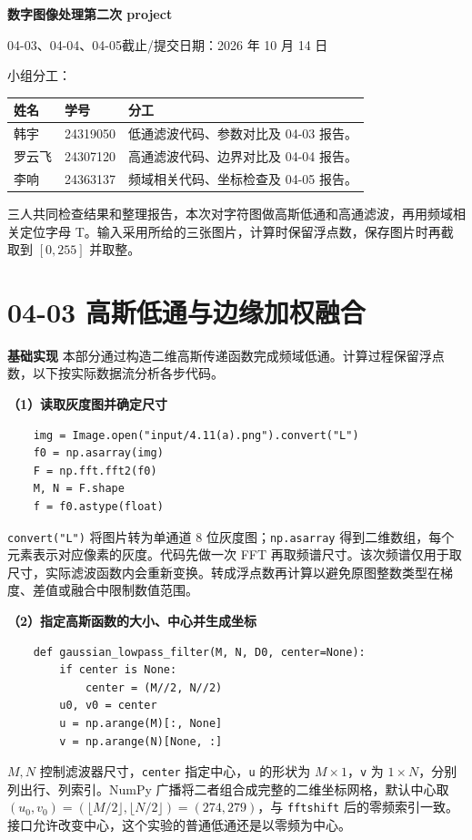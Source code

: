 \documentclass[UTF8,a4paper,zihao=5,fontset=fandol]{ctexart}
\begin{document}
\thispagestyle{plain}
\begin{center}
{\LARGE\bfseries 数字图像处理\quad 第二次 project}\par\vspace{5pt}
04-03、04-04、04-05\qquad 截止/提交日期：2026 年 10 月 14 日
\end{center}
\noindent 小组分工：
\begin{center}\small
\begin{tabularx}{\linewidth}{@{}llX@{}}\toprule
姓名 & 学号 & 分工\\\midrule
韩宇 & 24319050 & 低通滤波代码、参数对比及 04-03 报告。\\
罗云飞 & 24307120 & 高通滤波代码、边界对比及 04-04 报告。\\
李响 & 24363137 & 频域相关代码、坐标检查及 04-05 报告。\\\bottomrule
\end{tabularx}
\end{center}
三人共同检查结果和整理报告，本次对字符图做高斯低通和高通滤波，再用频域相关定位字母 T。输入采用所给的三张图片，计算时保留浮点数，保存图片时再截取到 $[0,255]$ 并取整。

\section{04-03 高斯低通与边缘加权融合}
\textbf{基础实现}  本部分通过构造二维高斯传递函数完成频域低通。计算过程保留浮点数，以下按实际数据流分析各步代码。

\textbf{（1）读取灰度图并确定尺寸}
{\small
\begin{verbatim}
    img = Image.open("input/4.11(a).png").convert("L")
    f0 = np.asarray(img)
    F = np.fft.fft2(f0)
    M, N = F.shape
    f = f0.astype(float)
\end{verbatim}
}
\texttt{convert("L")} 将图片转为单通道 8 位灰度图；\texttt{np.asarray} 得到二维数组，每个元素表示对应像素的灰度。代码先做一次 FFT 再取频谱尺寸。该次频谱仅用于取尺寸，实际滤波函数内会重新变换。转成浮点数再计算以避免原图整数类型在梯度、差值或融合中限制数值范围。

\textbf{（2）指定高斯函数的大小、中心并生成坐标}
{\small
\begin{verbatim}
    def gaussian_lowpass_filter(M, N, D0, center=None):
        if center is None:
            center = (M//2, N//2)
        u0, v0 = center
        u = np.arange(M)[:, None]
        v = np.arange(N)[None, :]
\end{verbatim}
}
$M,N$ 控制滤波器尺寸，\texttt{center} 指定中心，\texttt{u} 的形状为 $M\times1$，\texttt{v} 为 $1\times N$，分别列出行、列索引。NumPy 广播将二者组合成完整的二维坐标网格，默认中心取 $(u_0,v_0)=(\lfloor M/2\rfloor,\lfloor N/2\rfloor)=(274,279)$，与 \texttt{fftshift} 后的零频索引一致。接口允许改变中心，这个实验的普通低通还是以零频为中心。
\end{document}
